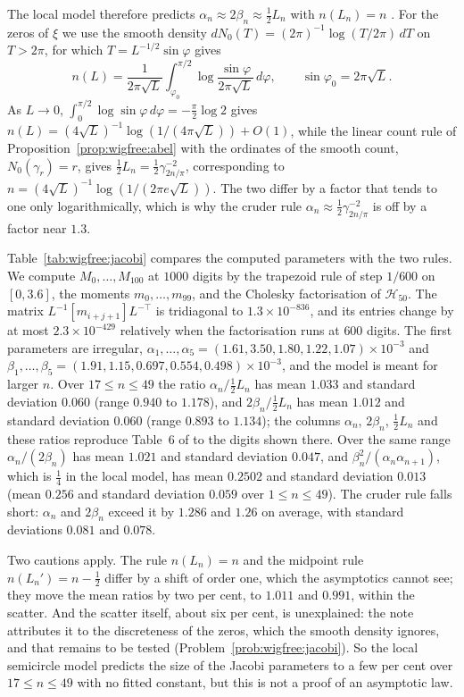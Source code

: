 The local model therefore predicts $\alpha_n\approx2\beta_n\approx\frac12L_n$ with $n(L_n)=n$ \cite{P26wig}. For the zeros of $\xi$ we use the smooth density $dN_0(T)=(2\pi)^{-1}\log(T/2\pi)\,dT$ on $T>2\pi$, for which $T=L^{-1/2}\sin\varphi$ gives
\[
n(L)=\frac1{2\pi\sqrt L}\int_{\varphi_0}^{\pi/2}\log\frac{\sin\varphi}{2\pi\sqrt L}\,d\varphi,\qquad\sin\varphi_0=2\pi\sqrt L .
\]
As $L\to0$, $\int_0^{\pi/2}\log\sin\varphi\,d\varphi=-\frac\pi2\log2$ gives $n(L)=(4\sqrt L)^{-1}\log(1/(4\pi\sqrt L))+O(1)$, while the linear count rule of Proposition~\ref{prop:wigfree:abel} with the ordinates of the smooth count, $N_0(\gamma_r)=r$, gives $\frac12L_n=\frac12\gamma_{2n/\pi}^{-2}$, corresponding to $n=(4\sqrt L)^{-1}\log(1/(2\pi e\sqrt L))$. The two differ by a factor that tends to one only logarithmically, which is why the cruder rule $\alpha_n\approx\frac12\gamma_{2n/\pi}^{-2}$ is off by a factor near $1.3$.

Table~\ref{tab:wigfree:jacobi} compares the computed parameters with the two rules. We compute $M_0,\dots,M_{100}$ at $1000$ digits by the trapezoid rule of step $1/600$ on $[0,3.6]$, the moments $m_0,\dots,m_{99}$, and the Cholesky factorisation of $\mathcal H_{50}$. The matrix $L^{-1}[m_{i+j+1}]L^{-\top}$ is tridiagonal to $1.3\times10^{-836}$, and its entries change by at most $2.3\times10^{-429}$ relatively when the factorisation runs at $600$ digits. The first parameters are irregular, $\alpha_1,\dots,\alpha_5=(1.61,3.50,1.80,1.22,1.07)\times10^{-3}$ and $\beta_1,\dots,\beta_5=(1.91,1.15,0.697,0.554,0.498)\times10^{-3}$, and the model is meant for larger $n$. Over $17\le n\le49$ the ratio $\alpha_n/\frac12L_n$ has mean $1.033$ and standard deviation $0.060$ (range $0.940$ to $1.178$), and $2\beta_n/\frac12L_n$ has mean $1.012$ and standard deviation $0.060$ (range $0.893$ to $1.134$); the columns $\alpha_n$, $2\beta_n$, $\frac12L_n$ and these ratios reproduce Table~6 of \cite{P26wig} to the digits shown there. Over the same range $\alpha_n/(2\beta_n)$ has mean $1.021$ and standard deviation $0.047$, and $\beta_n^2/(\alpha_n\alpha_{n+1})$, which is $\frac14$ in the local model, has mean $0.2502$ and standard deviation $0.013$ (mean $0.256$ and standard deviation $0.059$ over $1\le n\le49$). The cruder rule falls short: $\alpha_n$ and $2\beta_n$ exceed it by $1.286$ and $1.26$ on average, with standard deviations $0.081$ and $0.078$.

Two cautions apply. The rule $n(L_n)=n$ and the midpoint rule $n(L_n')=n-\frac12$ differ by a shift of order one, which the asymptotics cannot see; they move the mean ratios by two per cent, to $1.011$ and $0.991$, within the scatter. And the scatter itself, about six per cent, is unexplained: the note attributes it to the discreteness of the zeros, which the smooth density ignores, and that remains to be tested (Problem~\ref{prob:wigfree:jacobi}). So the local semicircle model predicts the size of the Jacobi parameters to a few per cent over $17\le n\le49$ with no fitted constant, but this is not a proof of an asymptotic law.


